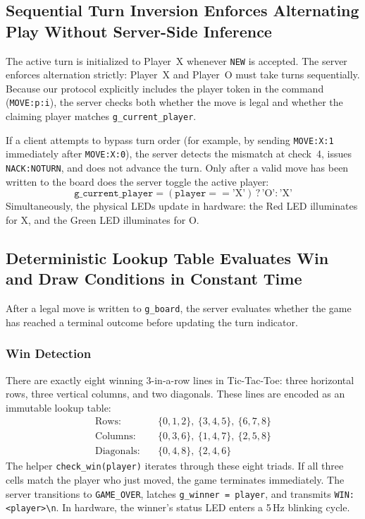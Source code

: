 \subsection{Sequential Turn Inversion Enforces Alternating Play Without Server-Side Inference}

The active turn is initialized to Player~X whenever \texttt{NEW} is accepted.
The server enforces alternation strictly: Player~X and Player~O must take turns sequentially.
Because our protocol explicitly includes the player token in the command (\texttt{MOVE:p:i}), the server checks both whether the move is legal and whether the claiming player matches \texttt{g\_current\_player}.

If a client attempts to bypass turn order (for example, by sending \texttt{MOVE:X:1} immediately after \texttt{MOVE:X:0}), the server detects the mismatch at check~4, issues \texttt{NACK:NOTURN}, and does not advance the turn.
Only after a valid move has been written to the board does the server toggle the active player:
\begin{equation}
\texttt{g\_current\_player} = (\texttt{player} == \text{'X'}) \mathbin{?} \text{'O'} : \text{'X'}
\end{equation}
Simultaneously, the physical LEDs update in hardware: the Red LED illuminates for X, and the Green LED illuminates for O.

\subsection{Deterministic Lookup Table Evaluates Win and Draw Conditions in Constant Time}

After a legal move is written to \texttt{g\_board}, the server evaluates whether the game has reached a terminal outcome before updating the turn indicator.

\subsubsection{Win Detection}
There are exactly eight winning 3-in-a-row lines in Tic-Tac-Toe: three horizontal rows, three vertical columns, and two diagonals.
These lines are encoded as an immutable lookup table:
\begin{align*}
\text{Rows:}\quad & \{0, 1, 2\},\ \{3, 4, 5\},\ \{6, 7, 8\} \\
\text{Columns:}\quad & \{0, 3, 6\},\ \{1, 4, 7\},\ \{2, 5, 8\} \\
\text{Diagonals:}\quad & \{0, 4, 8\},\ \{2, 4, 6\}
\end{align*}
The helper \texttt{check\_win(player)} iterates through these eight triads.
If all three cells match the player who just moved, the game terminates immediately.
The server transitions to \texttt{GAME\_OVER}, latches \texttt{g\_winner = player}, and transmits \texttt{WIN:<player>\textbackslash n}.
In hardware, the winner's status LED enters a 5\,Hz blinking cycle.

